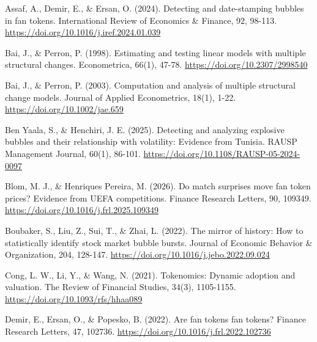 \documentclass[11pt,a4paper,onecolumn]{article}
\newenvironment{reportreference}{\begingroup\small\setlength{\parskip}{5pt}\leftskip=5mm\parindent=-5mm}{\par\endgroup}
\begin{document}
\begin{reportreference}
Assaf, A., Demir, E., \& Ersan, O. (2024). Detecting and date-stamping bubbles in fan tokens. International Review of Economics \& Finance, 92, 98-113. \url{https://doi.org/10.1016/j.iref.2024.01.039}
\end{reportreference}

\begin{reportreference}
Bai, J., \& Perron, P. (1998). Estimating and testing linear models with multiple structural changes. Econometrica, 66(1), 47-78. \url{https://doi.org/10.2307/2998540}
\end{reportreference}

\begin{reportreference}
Bai, J., \& Perron, P. (2003). Computation and analysis of multiple structural change models. Journal of Applied Econometrics, 18(1), 1-22. \url{https://doi.org/10.1002/jae.659}
\end{reportreference}

\begin{reportreference}
Ben Yaala, S., \& Henchiri, J. E. (2025). Detecting and analyzing explosive bubbles and their relationship with volatility: Evidence from Tunisia. RAUSP Management Journal, 60(1), 86-101. \url{https://doi.org/10.1108/RAUSP-05-2024-0097}
\end{reportreference}

\begin{reportreference}
Blom, M. J., \& Henriques Pereira, M. (2026). Do match surprises move fan token prices? Evidence from UEFA competitions. Finance Research Letters, 90, 109349. \url{https://doi.org/10.1016/j.frl.2025.109349}
\end{reportreference}

\begin{reportreference}
Boubaker, S., Liu, Z., Sui, T., \& Zhai, L. (2022). The mirror of history: How to statistically identify stock market bubble bursts. Journal of Economic Behavior \& Organization, 204, 128-147. \url{https://doi.org/10.1016/j.jebo.2022.09.024}
\end{reportreference}

\begin{reportreference}
Cong, L. W., Li, Y., \& Wang, N. (2021). Tokenomics: Dynamic adoption and valuation. The Review of Financial Studies, 34(3), 1105-1155. \url{https://doi.org/10.1093/rfs/hhaa089}
\end{reportreference}

\begin{reportreference}
Demir, E., Ersan, O., \& Popesko, B. (2022). Are fan tokens fan tokens? Finance Research Letters, 47, 102736. \url{https://doi.org/10.1016/j.frl.2022.102736}
\end{reportreference}
\end{document}
